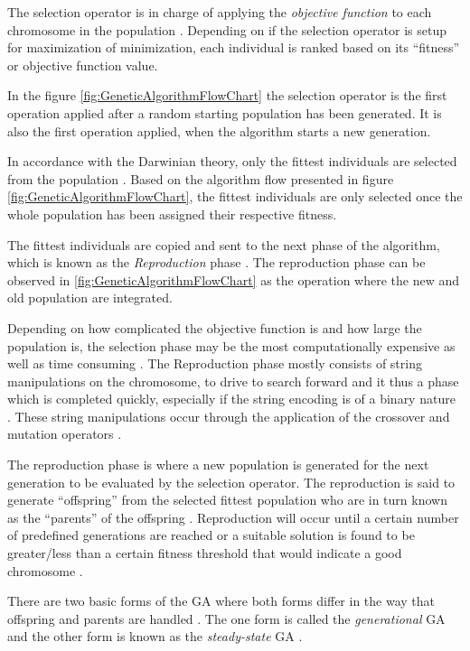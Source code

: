 The selection operator is in charge of applying the \emph{objective function} to each chromosome in the population \cite{AdaptiveSAGA,HumanPassiveGA}. Depending on if the selection operator is setup for maximization of minimization, each individual is ranked based on its ``fitness'' or objective function value.

In the figure \ref{fig:GeneticAlgorithmFlowChart} the selection operator is the first operation applied after a random starting population has been generated. It is also the first operation applied, when the algorithm starts a new generation.

In accordance with the Darwinian theory, only the fittest individuals are selected from the population \cite{HumanPassiveGA}. Based on the algorithm flow presented in figure \ref{fig:GeneticAlgorithmFlowChart}, the fittest individuals are only selected once the whole population has been assigned their respective fitness. 

The fittest individuals are copied and sent to the next phase of the algorithm, which is known as the \emph{Reproduction} phase \cite{HumanPassiveGA}. The reproduction phase can be observed in \ref{fig:GeneticAlgorithmFlowChart} as the operation where the new and old population are integrated.

Depending on how complicated the objective function is and how large the population is, the selection phase may be the most computationally expensive as well as time consuming \cite{AcceleratingGA}. The Reproduction phase mostly consists of string manipulations on the chromosome, to drive to search forward and it thus a phase which is completed quickly, especially if the string encoding is of a binary nature \cite{AcceleratingGA,AdaptiveSAGA}. These string manipulations occur through the application of the crossover and mutation operators \cite{ConstrainedGA}. 

The reproduction phase is where a new population is generated for the next generation to be evaluated by the selection operator. The reproduction is said to generate ``offspring'' from the selected fittest population who are in turn known as the ``parents'' of the offspring \cite{HumanPassiveGA,ConstrainedGA}. Reproduction will occur until a certain number of predefined generations are reached or a suitable solution is found to be greater/less than a certain fitness threshold that would indicate a good chromosome \cite{GATSP}.

There are two basic forms of the GA where both forms differ in the way that offspring and parents are handled \cite{FamilyGA}. The one form is called the \emph{generational} GA  and the other form is known as the \emph{steady-state} GA \cite{GeostatisticalGA,FamilyGA}.

